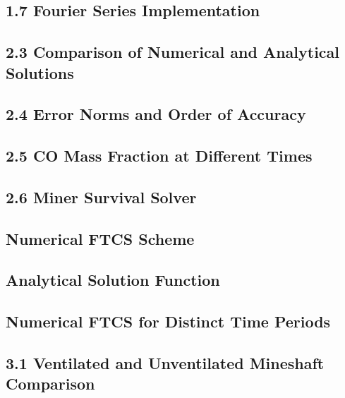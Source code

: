 \documentclass[a4paper,12pt]{article} %
\begin{document}
\subsection*{1.7 \quad Fourier Series Implementation}


\subsection*{2.3 \quad Comparison of Numerical and Analytical Solutions}


\subsection*{2.4 \quad Error Norms and Order of Accuracy}


\subsection*{2.5 \quad CO Mass Fraction at Different Times}


\subsection*{2.6 \quad Miner Survival Solver}


\subsection*{Numerical FTCS Scheme}


\subsection*{Analytical Solution Function}


\subsection*{Numerical FTCS for Distinct Time Periods}


\subsection*{3.1 \quad Ventilated and Unventilated Mineshaft Comparison}

\end{document}
